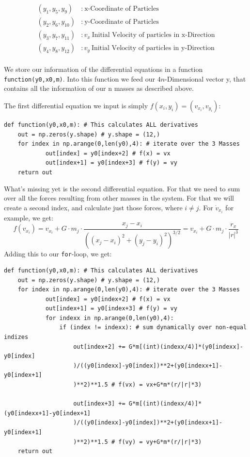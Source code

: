 \documentclass{article}
\begin{document}
\begin{align*}
(y_1,y_5,y_9) &: \ \text{x-Coordinate of Particles} \\
(y_2,y_6,y_{10}) &: \ \text{y-Coordinate of Particles} \\
(y_3,y_7,y_{11}) &: v_x \ \text{Initial Velocity of particles in x-Direction} \\
(y_4,y_8,y_{12}) &: v_y \ \text{Initial Velocity of particles in y-Direction} \\
\end{align*}

We store our information of the differential equations in a function
\texttt{function(y0,x0,m)}. Into this function we feed our \( 4n \)-Dimensional
vector y, that contains all the information of our n masses as described above.

The first differential equation we input is simply 
\( f(x_i,y_i) = ( v_{x_i} , v_{y_i} ) \):
\begin{lstlisting}
def function(y0,x0,m): # This calculates ALL derivatives
    out = np.zeros(y.shape) # y.shape = (12,)
    for index in np.arange(0,len(y0),4): # iterate over the 3 Masses
            out[index] = y0[index+2] # f(x) = vx
            out[index+1] = y0[index+3] # f(y) = vy
    return out
\end{lstlisting}
What's missing yet is the second differential equation. For that we need to sum
over all the forces resulting from other masses in the system. For that we will
create a second index, and calculate just those forces, where \( i \ne j \).
For \( \dot{v}_{x_i} \) for example, we get:
\[ 
    f(v _{x_i}) = v _{x_i} + G \cdot m_j \cdot \frac{x_j - x_i}{((x_j - x_i)^2
    + (y_j-y_i)^2)^{3/2}} = v _{x_i} + G \cdot m_j \cdot \frac{r_x}{|r|^3}
\]
Adding this to our \texttt{for}-loop, we get:
\begin{lstlisting}
def function(y0,x0,m): # This calculates ALL derivatives
    out = np.zeros(y.shape) # y.shape = (12,)
    for index in np.arange(0,len(y0),4): # iterate over the 3 Masses
            out[index] = y0[index+2] # f(x) = vx
            out[index+1] = y0[index+3] # f(y) = vy
            for indexx in np.arange(0,len(y0),4):
                if (index != indexx): # sum dynamically over non-equal indizes 
                    out[index+2] += G*m[(int)(indexx/4)]*(y0[indexx]-y0[index]
                    )/((y0[indexx]-y0[index])**2+(y0[indexx+1]-y0[index+1]
                    )**2)**1.5 # f(vx) = vx+G*m*(r/|r|*3)

                    out[index+3] += G*m[(int)(indexx/4)]*(y0[indexx+1]-y0[index+1]
                    )/((y0[indexx]-y0[index])**2+(y0[indexx+1]-y0[index+1]
                    )**2)**1.5 # f(vy) = vy+G*m*(r/|r|*3)
    return out
\end{lstlisting}
\end{document}
